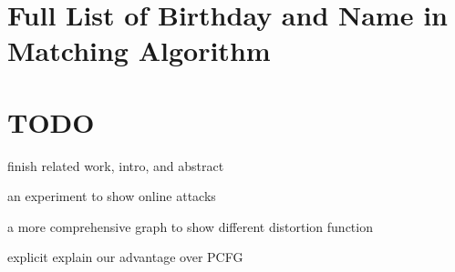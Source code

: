 \documentclass{sig-alternate}
\begin{document}

%
%
\appendix
\section{Full List of Birthday and Name in Matching Algorithm}
\section{TODO}
finish related work, intro, and abstract

an experiment to show online attacks

a more comprehensive graph to show different distortion function

explicit explain our advantage over PCFG
\end{document}
